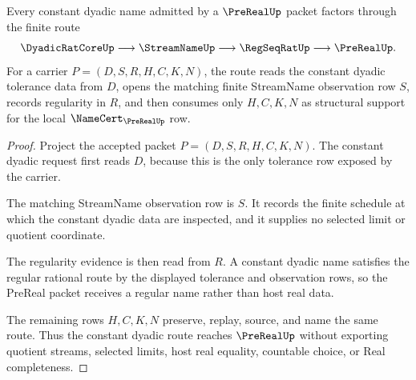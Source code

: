 \begin{theorem}
\label{thm:pre-real-constant-dyadic-route}
Every constant dyadic name admitted by a $\PreRealUp$ packet factors through
the finite route
$$
\DyadicRatCoreUp \longrightarrow \StreamNameUp \longrightarrow \RegSeqRatUp
\longrightarrow \PreRealUp .
$$
For a carrier $P=(D,S,R,H,C,K,N)$, the route reads the constant dyadic
tolerance data from $D$, opens the matching finite StreamName observation row
$S$, records regularity in $R$, and then consumes only $H,C,K,N$ as structural
support for the local $\NameCert_{\PreRealUp}$ row.
\end{theorem}
\begin{proof}
Project the accepted packet $P=(D,S,R,H,C,K,N)$. The constant dyadic request
first reads $D$, because this is the only tolerance row exposed by the carrier.

The matching StreamName observation row is $S$. It records the finite schedule
at which the constant dyadic data are inspected, and it supplies no selected
limit or quotient coordinate.

The regularity evidence is then read from $R$. A constant dyadic name satisfies
the regular rational route by the displayed tolerance and observation rows, so
the PreReal packet receives a regular name rather than host real data.

The remaining rows $H,C,K,N$ preserve, replay, source, and name the same route.
Thus the constant dyadic route reaches $\PreRealUp$ without exporting quotient
streams, selected limits, host real equality, countable choice, or Real
completeness.
\end{proof}


\begin{closurestatus}{\PreRealUp}
  \theoryclosure{\seedClosure}
  \formalstatus{\unformalizedV}
\end{closurestatus}
